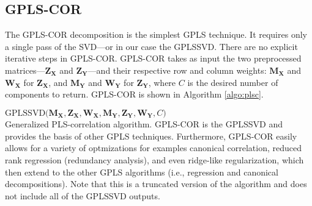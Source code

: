 \documentclass[12pt]{article}
\begin{document}
\hypertarget{gpls-cor}{%
\subsection{GPLS-COR}\label{gpls-cor}}

The GPLS-COR decomposition is the simplest GPLS technique. It requires
only a single pass of the SVD---or in our case the GPLSSVD. There are no
explicit iterative steps in GPLS-COR. GPLS-COR takes as input the two
preprocessed matrices---\({\mathbf Z}_{\mathbf X}\) and
\({\mathbf Z}_{\mathbf Y}\)---and their respective row and column
weights: \({\mathbf M}_{\mathbf X}\) and \({\mathbf W}_{\mathbf X}\) for
\({\mathbf Z}_{\mathbf X}\), and \({\mathbf M}_{\mathbf Y}\) and
\({\mathbf W}_{\mathbf Y}\) for \({\mathbf Z}_{\mathbf Y}\), where \(C\)
is the desired number of components to return. GPLS-COR is shown in
Algorithm \ref{algo:plsc}.

\begin{algorithm}
\DontPrintSemicolon
\SetAlgoLined
{}
\BlankLine
  $\mathrm{GPLSSVD(} {\mathbf M}_{\mathbf{X}}, {\mathbf Z}_{{\mathbf X}}, {\mathbf W}_{\mathbf{X}}, {\mathbf M}_{\mathbf{Y}}, {\mathbf Z}_{{\mathbf Y}}, {\mathbf W}_{\mathbf{Y}}, C \mathrm{)}$ \\
\caption{Generalized PLS-correlation algorithm. GPLS-COR is the GPLSSVD and provides the basis of other GPLS techniques. Furthermore, GPLS-COR easily allows for a variety of optmizations for examples canonical correlation, reduced rank regression (redundancy analysis), and even ridge-like regularization, which then extend to the other GPLS algorithms (i.e., regression and canonical decompositions). Note that this is a truncated version of the algorithm and does not include all of the GPLSSVD outputs.}
\label{algo:plsc}
\end{algorithm}
\end{document}
